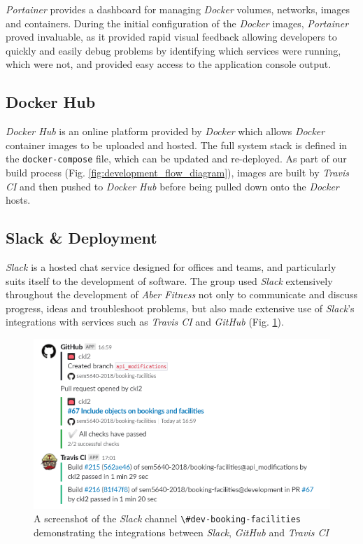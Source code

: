 \textit{Portainer} provides a dashboard for managing \textit{Docker} volumes, networks, images and containers. During the initial configuration of the \textit{Docker} images, \textit{Portainer} proved invaluable, as it provided rapid visual feedback allowing developers to quickly and easily debug problems by identifying which services were running, which were not, and provided easy access to the application console output.

\subsection{Docker Hub}
\textit{Docker Hub} is an online platform provided by \textit{Docker} which allows \textit{Docker} container images to be uploaded and hosted. The full system stack is defined in the \lstinline{docker-compose} file, which can be updated and re-deployed. As part of our build process (Fig. \ref{fig:development_flow_diagram}), images are built by \textit{Travis CI} and then pushed to \textit{Docker Hub} before being pulled down onto the \textit{Docker} hosts.

\subsection{Slack \& Deployment}
\textit{Slack} is a hosted chat service designed for offices and teams, and particularly suits itself to the development of software. The group used \textit{Slack} extensively throughout the development of \textit{Aber Fitness} not only to communicate and discuss progress, ideas and troubleshoot problems, but also made extensive use of \textit{Slack}'s integrations with services such as \textit{Travis CI} and \textit{GitHub} (Fig. \ref{fig:slack_travis_github}).

\begin{figure}[H]
    \centering
    \includegraphics[width=\textwidth]{Images/Slack_Travis_GitHub.png}
    \caption{A screenshot of the \textit{Slack} channel \lstinline{\#dev-booking-facilities} demonstrating the integrations between \textit{Slack}, \textit{GitHub} and \textit{Travis CI}}
    \label{fig:slack_travis_github}
\end{figure}

